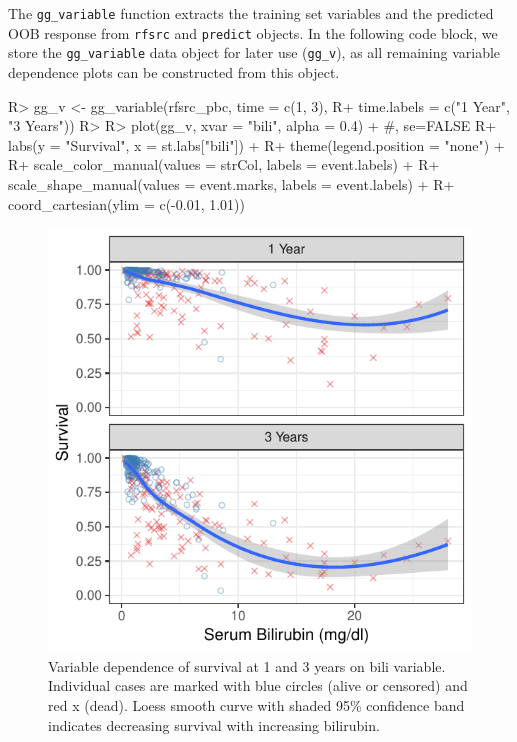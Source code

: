 \documentclass[article]{jss}
\begin{document}
The \texttt{gg\_variable} function extracts the training set variables
and the predicted OOB response from \texttt{rfsrc} and \texttt{predict}
objects. In the following code block, we store the \texttt{gg\_variable}
data object for later use (\texttt{gg\_v}), as all remaining variable
dependence plots can be constructed from this object.

\begin{Schunk}
\begin{Sinput}
R> gg_v <- gg_variable(rfsrc_pbc, time = c(1, 3),
R+                     time.labels = c("1 Year", "3 Years"))
R> 
R> plot(gg_v, xvar = "bili", alpha = 0.4) + #, se=FALSE
R+   labs(y = "Survival", x = st.labs["bili"]) +
R+   theme(legend.position = "none") +
R+   scale_color_manual(values = strCol, labels = event.labels) +
R+   scale_shape_manual(values = event.marks, labels = event.labels) +
R+   coord_cartesian(ylim = c(-0.01, 1.01))
\end{Sinput}
\begin{figure}[!htb]

{\centering \includegraphics{fig-rfs/rfs-variable-plotbili-1} 

}

\caption[Variable dependence of survival at 1 and 3 years on bili variable]{Variable dependence of survival at 1 and 3 years on bili variable. Individual cases are marked with blue circles (alive or censored) and red x (dead). Loess smooth curve with shaded 95\% confidence band indicates decreasing survival with increasing bilirubin.}\label{fig:variable-plotbili}
\end{figure}
\end{Schunk}
\end{document}
